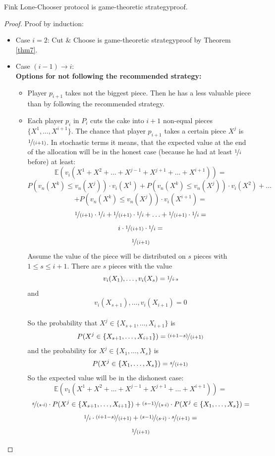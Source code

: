 \begin{lem}
\label{lc1}
Fink Lone-Chooser protocol is game-theoretic strategyproof.
\end{lem}
\begin{proof} Proof by induction:
\textcolor{white}{x}
\begin{itemize} \item{Case} $i=2$: Cut $\&$ Choose is game-theoretic strategyproof by Theorem \ref{thm7}.\\
\item{Case} $(i-1) \rightarrow i$:\\ 
\newline
\textbf{Options for not following the recommended strategy:}\\
\begin{itemize}
\item Player $p_{i+1}$ takes not the biggest piece. Then he has a less valuable piece\\than by following the recommended strategy. 
\item Each player $p_i$ in $P_i$ cuts the cake into $i+1$ non-equal pieces $\{X^1, \ldots ,X^{i+1}\}$. The chance that player $p_{i+1}$ takes a certain piece $X^j$ is $\nicefrac{1}{(i+1)}$. In stochastic terms it means, that the expected value at the end of the allocation will be in the honest case (because he had at least $\nicefrac{1}{i}$ before) at least: 
$$ \mathbb{E}(v_i(X^1+X^2+\ldots+X^{j-1}+X^{j+1}+\ldots+X^{i+1}))=$$
$$P(v_n(X^k)\leq v_n(X^j))\cdot v_i(X^1)+P(v_n(X^k)\leq v_n(X^j))\cdot v_i(X^2)+\ldots$$$$+P(v_n(X^k)\leq v_n(X^j))\cdot v_i(X^{i+1})=$$
$$\nicefrac{1}{(i+1)}\cdot \nicefrac{1}{i}+\nicefrac{1}{(i+1)}\cdot \nicefrac{1}{i} + \ldots +\nicefrac{1}{(i+1)}\cdot \nicefrac{1}{i}=$$$$i\cdot\nicefrac{1}{(i+1)}\cdot \nicefrac{1}{i}=$$$$\nicefrac{1}{(i+1)}$$
\newpage
Assume the value of the piece will be distributed on $s$ pieces with\\$1 \leq s \leq i+1$. There are $s$ pieces with the value $$v_i(X_1),\ldots, v_i(X_s)=\nicefrac{1}{i\cdot s}$$ and $$v_i(X_{s+1}),\ldots, v_i(X_{i+1})=
0$$ \\So the probability that $X^j \in \{X_{s+1},\ldots, X_{i+1}\}$ is $$P(X^j \in \{X_{s+1},\ldots, X_{i+1}\})= \nicefrac{(i+1-s)}{(i+1)}$$ and the probability for $X^j \in \{X_{1},\ldots, X_{s}\}$ is $$P(X^j \in \{X_{1},\ldots, X_{s}\})= \nicefrac{s}{(i+1)}$$ So the expected value will be in the dishonest case:  $$\mathbb{E}(v_1(X^1+X^2+\ldots+X^{j-1}+X^{j+1}+\ldots+X^{i+1}))=$$$$ \nicefrac{s}{(s \cdot i)} \cdot P(X^j \in \{X_{s+1},\ldots, X_{i+1}\})+\nicefrac{(s-1)}{(s \cdot i)} \cdot P(X^j \in \{X_{1},\ldots, X_{s}\})=$$$$ \nicefrac{1}{i} \cdot \nicefrac{(i+1-s)}{(i+1)} + \nicefrac{(s-1)}{(s\cdot i)}\cdot \nicefrac{s}{(i+1)}=$$$$\nicefrac{1}{(i+1)} $$

\end{itemize}
\end{itemize}
\end{proof}
